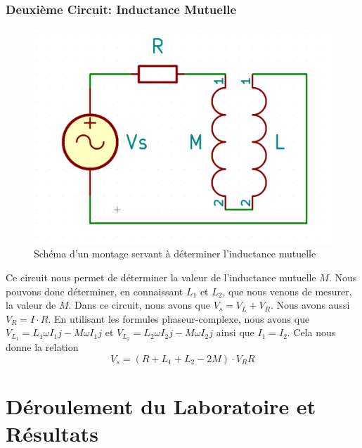 \documentclass{article}
\begin{document}
\subsubsection{Deuxième Circuit: Inductance Mutuelle}
\begin{figure}[h]
    \centering
        \includegraphics[scale = 0.12]{RM.png}
        \caption{Schéma d'un montage servant à déterminer l'inductance mutuelle}
        \label{fig:my_label}
    \end{figure}
Ce circuit nous permet de déterminer la valeur de l'inductance mutuelle $M$.
Nous pouvons donc déterminer, en connaissant $L_{1}$ et $L_{2}$, que nous venons de mesurer, la valeur de $M$.
Dans ce circuit, nous avons que $V_{s} = V_{L} + V_{R}$. Nous avons aussi $V_{R} = I\cdot R$. En utilisant les formules
phaseur-complexe, nous avons que $V_{L_{1}} = L_{1}\omega I_{1}j - M\omega I_{1}j$ et 
$V_{L_{2}} = L_{2}\omega I_{2}j - M\omega I_{2}j$ ainsi que $I_{1} = I_{2}$. Cela nous donne la relation
\begin{equation}
    V_{s} = (R + L_{1} + L_{2} - 2M)\cdot V_{R}R
\end{equation}
\section{Déroulement du Laboratoire et Résultats}
\end{document}
